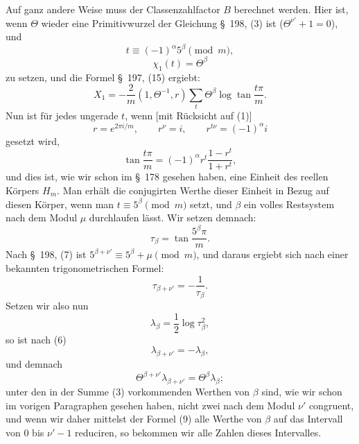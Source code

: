 \documentclass[11pt]{article}
\begin{document}
Auf ganz andere Weise muss der Classenzahlfactor $B$ berechnet werden. Hier ist, wenn $\Theta$ wieder eine Primitivwurzel der Gleichung \S~198, (3) ist ($\Theta^{\nu'}+1=0$), und
\begin{equation}
t\equiv(-1)^\alpha5^\beta\pmod m,
\tag{1}
\end{equation}
\begin{equation}
\chi_1(t)=\Theta^\beta
\tag{2}
\end{equation}
zu setzen, und die Formel \S~197, (15) ergiebt:
\begin{equation}
X_1=-\frac2m(1,\Theta^{-1},r)\sum_t\Theta^\beta\log\tan\frac{t\pi}{m}.
\tag{3}
\end{equation}
Nun ist für jedes ungerade $t$, wenn [mit Rücksicht auf (1)]
\[
r=e^{2\pi i/m},
\qquad
r^\nu=i,
\qquad
r^{t\nu}=(-1)^\alpha i
\]
gesetzt wird,
\begin{equation}
\tan\frac{t\pi}{m}=(-1)^\alpha r^t\frac{1-r^t}{1+r^t},
\tag{4}
\end{equation}
und dies ist, wie wir schon im \S~178 gesehen haben, eine Einheit des reellen Körpers $H_m$. Man erhält die conjugirten Werthe dieser Einheit in Bezug auf diesen Körper, wenn man $t\equiv5^\beta\pmod m$ setzt, und $\beta$ ein volles Restsystem nach dem Modul $\mu$ durchlaufen lässt. Wir setzen demnach:
\begin{equation}
\tau_\beta=\tan\frac{5^\beta\pi}{m}.
\tag{5}
\end{equation}
Nach \S~198, (7) ist $5^{\beta+\nu'}\equiv5^\beta+\mu\pmod m$, und daraus ergiebt sich nach einer bekannten trigonometrischen Formel:
\begin{equation}
\tau_{\beta+\nu'}=-\frac1{\tau_\beta}.
\tag{6}
\end{equation}
Setzen wir also nun
\begin{equation}
\lambda_\beta=\frac12\log\tau_\beta^2,
\tag{7}
\end{equation}
so ist nach (6)
\begin{equation}
\lambda_{\beta+\nu'}=-\lambda_\beta,
\tag{8}
\end{equation}
und demnach
\begin{equation}
\Theta^{\beta+\nu'}\lambda_{\beta+\nu'}=\Theta^\beta\lambda_\beta;
\tag{9}
\end{equation}
unter den in der Summe (3) vorkommenden Werthen von $\beta$ sind, wie wir schon im vorigen Paragraphen gesehen haben, nicht zwei nach dem Modul $\nu'$ congruent, und wenn wir daher mittelst
der Formel (9) alle Werthe von $\beta$ auf das Intervall von 0 bis $\nu'-1$ reduciren, so bekommen wir alle Zahlen dieses Intervalles.
\end{document}
